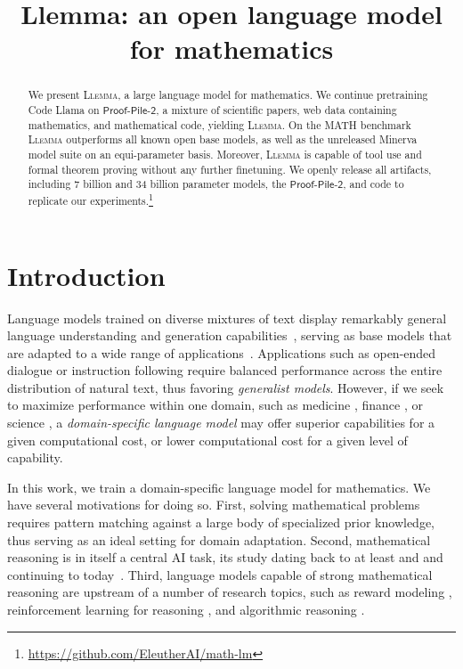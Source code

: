 \title{Llemma: an open language model for mathematics}

\begin{abstract}
We present \textsc{Llemma}, a large language model for mathematics. We continue pretraining Code Llama on $\mathsf{Proof}$-$\mathsf{Pile}$-$\mathsf{2}$, a mixture of scientific papers, web data containing mathematics, and mathematical code, yielding \textsc{Llemma}.  
  On the MATH benchmark \textsc{Llemma} outperforms all known open base models, as well as the unreleased Minerva model suite on an equi-parameter basis. Moreover, \textsc{Llemma} is capable of tool use and formal theorem proving without any further finetuning. We openly release all artifacts, including 7 billion and 34 billion parameter models, the $\mathsf{Proof}$-$\mathsf{Pile}$-$\mathsf{2}$, and code to replicate our experiments.\footnote{\url{https://github.com/EleutherAI/math-lm}}
\end{abstract}

\section{Introduction}

Language models trained on diverse mixtures of text display remarkably general language understanding and generation capabilities~\citep{brown2020gpt3,chowdhery2022palm}, serving as base models that are adapted to a wide range of applications~\citep{raffel2023exploring}. Applications such as open-ended dialogue \citep{thoppilan2022lamda, touvron2023llama} or instruction following \citep{ouyang2022training, wei2022finetuned} require balanced performance across the entire distribution of natural text, thus favoring \textit{generalist models}. However, if we seek to maximize performance within one domain, such as medicine \citep{singhal2022large, singhal2023expertlevel}, finance \citep{wu2023bloomberggpt}, or science \citep{taylor2022galactica}, a {\it domain-specific language model} may offer superior capabilities for a given computational cost, or lower computational cost for a given level of capability.

In this work, we train a domain-specific language model for mathematics. We have several motivations for doing so. First, solving mathematical problems requires pattern matching against a large body of specialized prior knowledge, thus serving as an ideal setting for domain adaptation. Second, mathematical reasoning is in itself a central AI task, its study dating back to at least \cite{Gelernter1995RealizationOA} and \cite{wang1960mechanical} and continuing to today~\citep{lu-etal-2023-survey}. Third, language models capable of strong mathematical reasoning are upstream of a number of research topics, such as reward modeling \citep{uesato2022solving, lightman2023lets}, reinforcement learning for reasoning \citep{polu2022formal, lample2022hypertree}, and algorithmic reasoning \citep{zhou2022teaching,zhang2023transformers}.

